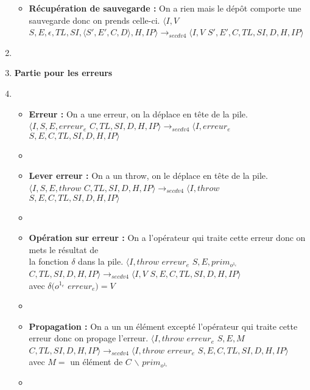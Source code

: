 \documentclass[10pt,a4paper]{article}
\begin{document}
\begin{enumerate}
\begin{itemize}
					\item[] \textbf{Récupération de sauvegarde :}  On a rien mais le dépôt comporte une sauvegarde donc on prends celle-ci.
					\smallbreak  
					$\langle I,V$ $S,E,\epsilon,TL,SI,\langle S',E',C,D\rangle,H,IP\rangle
					\longrightarrow_{secdv4} \langle I,V$ $S',E',C,TL,SI,D,H,IP\rangle$
				\end{itemize}
				\item[]
			
			    
			    
			    \item[] \textbf{Partie pour les erreurs} 
			    \item[]
			    \begin{itemize}
			    	\item[] \textbf{Erreur :} On a une erreur, on la déplace en tête de la pile.
			    	\smallbreak
			    	$\langle I,S,E,erreur_{e}$ $C,TL,SI,D,H,IP\rangle
			    	\longrightarrow_{secdv4} \langle I,erreur_{e}$ $S,E,C,TL,SI,D,H,IP\rangle$
			    	\item[]
			    
			    	\item[] \textbf{Lever erreur :} On a un throw, on le déplace en tête de la pile.
			    	\smallbreak
			    	$\langle I,S,E,throw$ $C,TL,SI,D,H,IP\rangle
			    	\longrightarrow_{secdv4} \langle I,throw$ $S,E,C,TL,SI,D,H,IP\rangle$
			    	\item[]
			    	
			    	\item[] \textbf{Opération sur erreur :} On a l'opérateur qui traite cette erreur donc on mets le résultat de 
			    	\\la fonction $\delta$ dans la pile.
			    	\smallbreak
			    	$\langle I,throw$ $erreur_{e}$ $S,E,prim_{o^{1_{e}}}$ $C,TL,SI,D,H,IP\rangle
			    	\longrightarrow_{secdv4} \langle I,V$ $S,E,C,TL,SI,D,H,IP\rangle$
			    	\\ avec $\delta(o^{1_{e}}$ $erreur_{e}) = V$
			    	\item[]
			    	
			    	\item[] \textbf{Propagation :} On a un un élément excepté l'opérateur qui traite cette erreur donc on propage l'erreur.
			    	\smallbreak
			    	$\langle I,throw$ $erreur_{e}$ $S,E,M$ $C,TL,SI,D,H,IP\rangle
			    	\longrightarrow_{secdv4} \langle I,throw$ $erreur_{e}$ $S,E,C,TL,SI,D,H,IP\rangle$ 
			    	\\avec $M = $ un élément de $C$ $\backslash$ $prim_{o^{1_{e}}}$
			    	\item[]
			    	

\end{itemize}
\end{enumerate}
\end{document}
